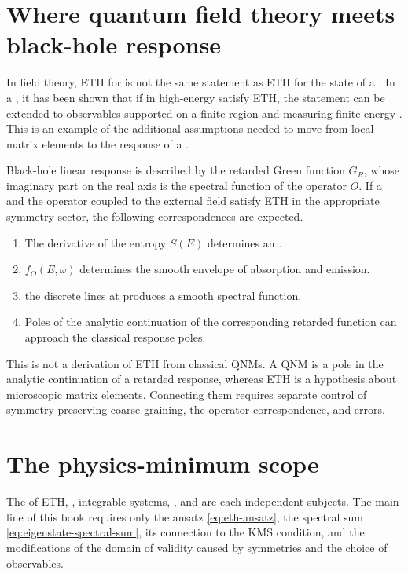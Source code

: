\section{Where quantum field theory meets black-hole response}

In field theory, ETH for  is not the same statement as ETH for the state of a . In a , it has been shown that if  in high-energy  satisfy ETH, the statement can be extended to observables supported on a finite region and measuring finite energy \cite{Lashkari:2018CFTETH}. This is an example of the additional assumptions needed to move from local matrix elements to the response of a .

Black-hole linear response is described by the retarded Green function $G_R$, whose imaginary part on the real axis is the spectral function of the operator $O$. If a  and the operator coupled to the external field satisfy ETH in the appropriate symmetry sector, the following correspondences are expected.

\begin{enumerate}[label=(\roman*),leftmargin=2.8em]
\item The derivative of the entropy $S(E)$ determines an .
\item $f_O(E,\omega)$ determines the smooth envelope of absorption and emission.
\item {} the discrete lines at  produces a smooth spectral function.
\item Poles of the analytic continuation of the corresponding retarded function can approach the classical response poles.
\end{enumerate}

This is not a derivation of ETH from classical QNMs. A QNM is a pole in the analytic continuation of a  retarded response, whereas ETH is a hypothesis about microscopic matrix elements. Connecting them requires separate control of symmetry-preserving coarse graining, the operator correspondence, and  errors.

\section{The physics-minimum scope}

The  of ETH, , integrable systems, , and  are each independent subjects. The main line of this book requires only the ansatz \eqref{eq:eth-ansatz}, the spectral sum \eqref{eq:eigenstate-spectral-sum}, its connection to the KMS condition, and the modifications of the domain of validity caused by symmetries and the choice of observables.

